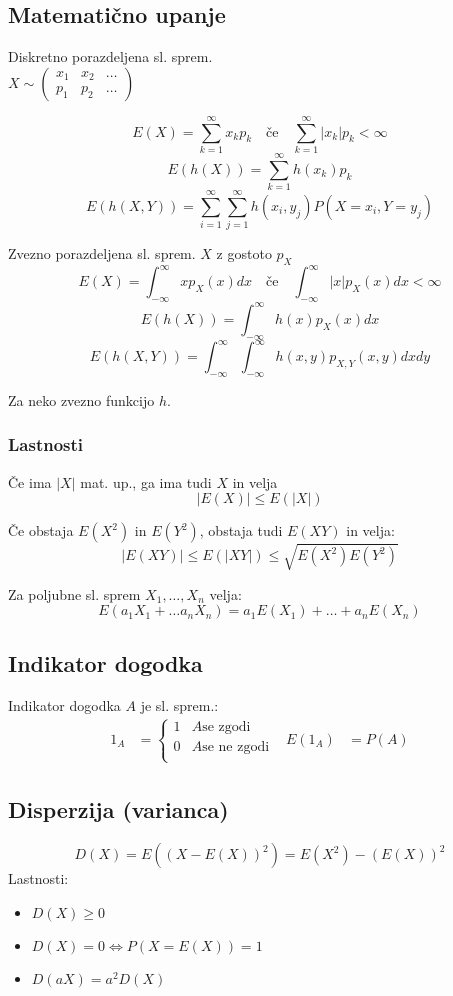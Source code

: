 \begin{multicols}{5}
\subsection{Matematično upanje}
Diskretno porazdeljena sl. sprem. \\
$ X \sim \left( \begin{matrix}
	x_1 & x_2 & \dots \\
	p_1 & p_2 & \dots
\end{matrix}\right) $

\[ E(X) = \sum_{k=1}^\infty x_k p_k \quad \text{če} \quad \sum_{k=1}^\infty |x_k| p_k < \infty \]
\[ E(h(X)) = \sum_{k=1}^\infty h(x_k) p_k \]
\[ E(h(X,Y)) = \sum_{i=1}^\infty \sum_{j=1}^\infty h(x_i, y_j) P(X=x_i, Y=y_j) \]

Zvezno porazdeljena sl. sprem. $X$ z gostoto $p_X$
\[E(X) = \int_{-\infty}^{\infty} x p_X(x) dx \quad \text{če} \quad \int_{-\infty}^{\infty} |x| p_X(x) dx  < \infty\]
\[E(h(X)) = \int_{-\infty}^{\infty} h(x) p_X(x) dx\]
\[E(h(X, Y)) = \int_{-\infty}^\infty \int_{-\infty}^\infty h(x, y) p_{X,Y}(x, y) dx dy\]

Za neko zvezno funkcijo $h$.

\subsubsection{Lastnosti}
Če ima $|X|$ mat. up., ga ima tudi $X$ in velja 
\[|E(X)| \leq E(|X|) \]

Če obstaja $E(X^2)$ in $E(Y^2)$, obstaja tudi $E(XY)$ in velja:
\[|E(XY)| \leq E(|XY|) \leq \sqrt{E(X^2)E(Y^2)} \]

Za poljubne sl. sprem $X_1, \dots, X_n$ velja:
\[ E(a_1 X_1 + \dots a_n X_n) = a_1 E(X_1) + \dots + a_n E(X_n) \]

\subsection{Indikator dogodka}
Indikator dogodka $A$ je sl. sprem.:
\begin{align*}
	1_A &= \begin{cases}
		1 & A \text{se zgodi} \\
		0 & A \text{se ne zgodi} \\
	\end{cases} &
	E(1_A) &= P(A)
\end{align*}

\subsection{Disperzija (varianca)}
\[D(X) = E((X - E(X))^2) = E(X^2) - (E(X))^2\]
Lastnosti: 
\begin{itemize}
	\item $D(X) \geq 0$
	\item $D(X) = 0 \iff P(X = E(X)) = 1$
	\item $D(aX) = a^2 D(X)$
\end{itemize}


\end{multicols}
